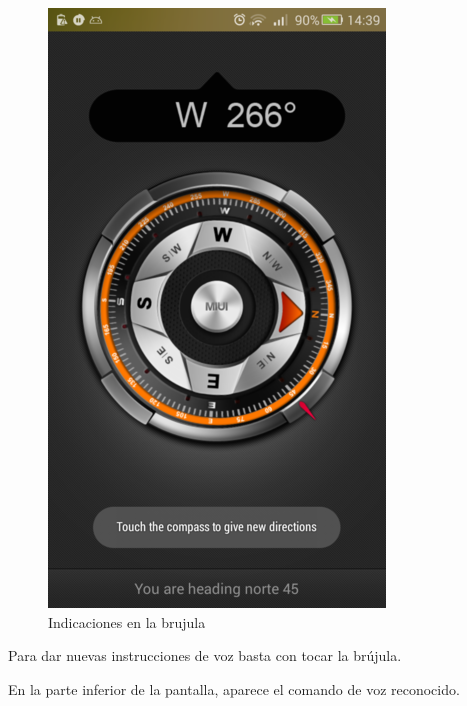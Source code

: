 \begin{figure}[htbp]
\centering
\includegraphics{./img/norte45.png}
\caption{Indicaciones en la brujula}
\end{figure}

Para dar nuevas instrucciones de voz basta con tocar la brújula.

En la parte inferior de la pantalla, aparece el comando de voz
reconocido.
